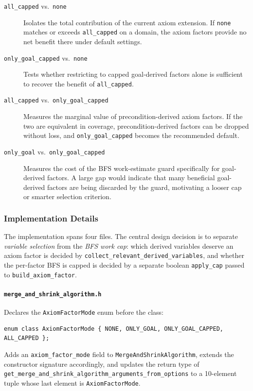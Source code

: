 \documentclass[11pt,a4paper]{article}
\begin{document}
\begin{description}
  \item[\texttt{all\_capped} vs.\ \texttt{none}]
    Isolates the total contribution of the current axiom extension.
    If \texttt{none} matches or exceeds \texttt{all\_capped} on a domain,
    the axiom factors provide no net benefit there under default settings.

  \item[\texttt{only\_goal\_capped} vs.\ \texttt{none}]
    Tests whether restricting to capped goal-derived factors alone is
    sufficient to recover the benefit of \texttt{all\_capped}.

  \item[\texttt{all\_capped} vs.\ \texttt{only\_goal\_capped}]
    Measures the marginal value of precondition-derived axiom factors.
    If the two are equivalent in coverage, precondition-derived factors
    can be dropped without loss, and \texttt{only\_goal\_capped} becomes
    the recommended default.

  \item[\texttt{only\_goal} vs.\ \texttt{only\_goal\_capped}]
    Measures the cost of the BFS work-estimate guard specifically for
    goal-derived factors.  A large gap would indicate that many beneficial
    goal-derived factors are being discarded by the guard, motivating a
    looser cap or smarter selection criterion.
\end{description}

\subsubsection{Implementation Details}

The implementation spans four files.  The central design decision is to
separate \emph{variable selection} from the \emph{BFS work cap}: which derived
variables deserve an axiom factor is decided by \texttt{collect\_relevant\_derived\_variables},
and whether the per-factor BFS is capped is decided by a separate boolean
\texttt{apply\_cap} passed to \texttt{build\_axiom\_factor}.

\paragraph{\texttt{merge\_and\_shrink\_algorithm.h}}

Declares the \texttt{AxiomFactorMode} enum before the class:
\begin{lstlisting}
enum class AxiomFactorMode { NONE, ONLY_GOAL, ONLY_GOAL_CAPPED, ALL_CAPPED };
\end{lstlisting}
Adds an \texttt{axiom\_factor\_mode} field to \texttt{MergeAndShrinkAlgorithm},
extends the constructor signature accordingly, and updates the return type of
\texttt{get\_merge\_and\_shrink\_algorithm\_arguments\_from\_options} to a
10-element tuple whose last element is \texttt{AxiomFactorMode}.
\end{document}
